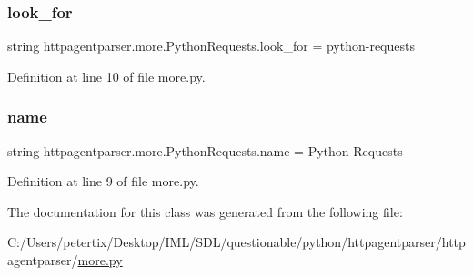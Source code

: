 \subsubsection{\texorpdfstring{look\+\_\+for}{look\_for}}
{\footnotesize\ttfamily string httpagentparser.\+more.\+Python\+Requests.\+look\+\_\+for = \textquotesingle{}python-\/requests\textquotesingle{}\hspace{0.3cm}{\ttfamily [static]}}



Definition at line 10 of file more.\+py.

\hypertarget{classhttpagentparser_1_1more_1_1_python_requests_a5bc8a2f14cd3918a6a601510a0985ac6}{}\label{classhttpagentparser_1_1more_1_1_python_requests_a5bc8a2f14cd3918a6a601510a0985ac6} 
\subsubsection{\texorpdfstring{name}{name}}
{\footnotesize\ttfamily string httpagentparser.\+more.\+Python\+Requests.\+name = \textquotesingle{}Python Requests\textquotesingle{}\hspace{0.3cm}{\ttfamily [static]}}



Definition at line 9 of file more.\+py.



The documentation for this class was generated from the following file\+:\begin{DoxyCompactItemize}
\item 
C\+:/\+Users/petertix/\+Desktop/\+I\+M\+L/\+S\+D\+L/questionable/python/httpagentparser/httpagentparser/\hyperlink{more_8py}{more.\+py}\end{DoxyCompactItemize}
